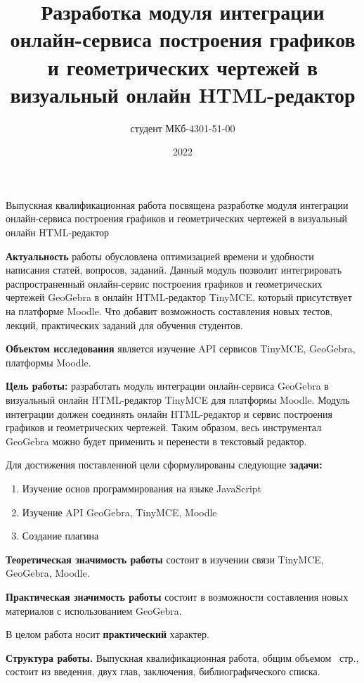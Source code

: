 \documentclass[14pt,Diplom]{diplomwork}
\date{2022}
\author{студент МКб-4301-51-00}{Мельков Алексей Константинович}
\title{Разработка модуля интеграции онлайн-сервиса построения графиков и геометрических чертежей в визуальный онлайн HTML-редактор}
\institute{математики и информационных систем}
\begin{document}
	
\maketitle
\makereferat		%
\newpage

\tableofcontents


Выпускная квалификационная работа посвящена разработке модуля интеграции онлайн-сервиса построения графиков и геометрических чертежей в визуальный онлайн HTML-редактор


\textbf{Актуальность} работы обусловлена оптимизацией времени и удобности написания статей, вопросов, заданий. Данный модуль позволит интегрировать распространенный онлайн-сервис построения графиков и геометрических чертежей GeoGebra в онлайн HTML-редактор TinyMCE, который присутствует на платформе Moodle. Что добавит возможность составления новых тестов, лекций, практических заданий для обучения студентов.

\textbf{Объектом исследования} является изучение API сервисов TinyMCE, GeoGebra, платформы Moodle.

\textbf{Цель работы:} разработать модуль интеграции онлайн-сервиса GeoGebra в визуальный онлайн HTML-редактор TinyMCE для платформы Moodle. Модуль интеграции должен соединять онлайн HTML-редактор и сервис построения графиков и геометрических чертежей. Таким образом, весь инструментал GeoGebra можно будет применить и перенести в текстовый редактор.

Для достижения поставленной цели сформулированы следующие \mbox{\textbf{задачи:}}

\begin{enumerate}
	\item Изучение основ программирования на языке JavaScript
	\item Изучение API GeoGebra, TinyMCE, Moodle
	\item Создание плагина
\end{enumerate}



\textbf{Теоретическая значимость работы} состоит в изучении связи TinyMCE, GeoGebra, Moodle.

\textbf{Практическая значимость работы} состоит в возможности составления новых материалов с использованием GeoGebra.

В целом работа носит \textbf{практический} характер.



\textbf{Структура работы.} Выпускная квалификационная работа, общим объемом \pageref{LastPage}~стр., состоит из введения, двух глав, заключения, библиографического списка.
\end{document}
